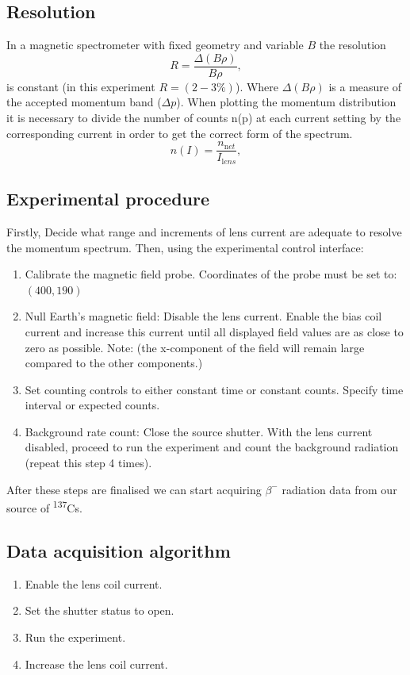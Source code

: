 \documentclass[10pt, a4paper]{article}
\begin{document}
\begin{multicols}{2}
\subsection{Resolution}

In a magnetic spectrometer with fixed geometry and variable $B$ the resolution 
\begin{equation}R = \frac{\Delta(B \rho)}{B \rho},
\end{equation}
is constant (in this experiment $R = (2-3\%)$). 
Where $\Delta(B \rho)$ is a measure of the accepted momentum band ($\Delta p$). 
When plotting the momentum distribution it is necessary to divide the number of counts n(p) at each current setting by the corresponding current in order to get the correct form of the spectrum\cite{Siegbahn}.
\begin{equation} n(I) = \frac{n_{\mathrm net}}{I_{\mathrm lens}},
\end{equation}

\subsection{Experimental procedure}
Firstly, Decide what range and increments of lens current are adequate to resolve the momentum spectrum.
Then, using the experimental control interface:
\begin{enumerate}
\item Calibrate the magnetic field probe.
    Coordinates of the probe must be set to: $(400,190)$
\item Null Earth's magnetic field:
    Disable the lens current.
    Enable the bias coil current and increase this current until all displayed field values are as close to zero as possible. 
    Note: (the x-component of the field will remain large compared to the other components.)
\item Set counting controls to either constant time or constant counts.
    Specify time interval or expected counts.
\item Background rate count:
    Close the source shutter.
    With the lens current disabled, proceed to run the experiment and count the background radiation (repeat this step 4 times).
\end{enumerate}
After these steps are finalised we can start acquiring $\beta^{-}$ radiation data from our source of \textsuperscript{137}Cs.
\subsection{Data acquisition algorithm}
\begin{enumerate}
\item Enable the lens coil current.    
\item Set the shutter status to open.
\item Run the experiment.
\item Increase the lens coil current.



\end{enumerate}
\end{multicols}
\end{document}
